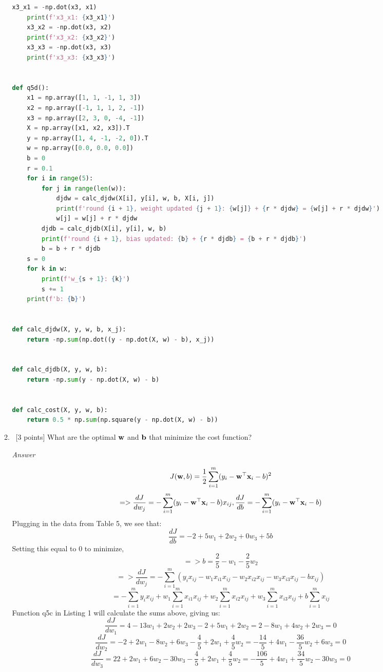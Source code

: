 \documentclass[12pt, fullpage,letterpaper]{article}
\begin{document}
\begin{enumerate}
\begin{enumerate}
\begin{lstlisting}[language=Python, caption=QuestionAnswers.part1]
    x3_x1 = -np.dot(x3, x1)
    print(f'x3_x1: {x3_x1}')
    x3_x2 = -np.dot(x3, x2)
    print(f'x3_x2: {x3_x2}')
    x3_x3 = -np.dot(x3, x3)
    print(f'x3_x3: {x3_x3}')


def q5d():
    x1 = np.array([1, 1, -1, 1, 3])
    x2 = np.array([-1, 1, 1, 2, -1])
    x3 = np.array([2, 3, 0, -4, -1])
    X = np.array([x1, x2, x3]).T
    y = np.array([1, 4, -1, -2, 0]).T
    w = np.array([0.0, 0.0, 0.0])
    b = 0
    r = 0.1
    for i in range(5):
        for j in range(len(w)):
            djdw = calc_djdw(X[i], y[i], w, b, X[i, j])
            print(f'round {i + 1}, weight updated {j + 1}: {w[j]} + {r * djdw} = {w[j] + r * djdw}')
            w[j] = w[j] + r * djdw
        djdb = calc_djdb(X[i], y[i], w, b)
        print(f'round {i + 1}, bias updated: {b} + {r * djdb} = {b + r * djdb}')
        b = b + r * djdb
    s = 0
    for k in w:
        print(f'w_{s + 1}: {k}')
        s += 1
    print(f'b: {b}')


def calc_djdw(X, y, w, b, x_j):
    return -np.sum(np.dot((y - np.dot(X, w) - b), x_j))


def calc_djdb(X, y, w, b):
    return -np.sum(y - np.dot(X, w) - b)


def calc_cost(X, y, w, b):
    return 0.5 * np.sum(np.square(y - np.dot(X, w) - b))


	\end{lstlisting}
	
	\item~[3 points] What are the optimal ${\bf w}$ and ${\bf b}$ that minimize the cost function? 
	
	\emph{Answer}
	
	\[
	    J({\bf w}, b) = \frac{1}{2} \sum_{i=1}^m (y_i - {\bf w}^\top {\bf x}_i - b)^2
	\]
	\[
        => \frac{dJ}{dw_j} = -\sum_{i=1}^m (y_i - {\bf w}^\top {\bf x}_i - b)x_{ij},  \frac{dJ}{db} = -\sum_{i=1}^m (y_i - {\bf w}^\top {\bf x}_i - b)
    \]
    Plugging in the data from Table 5, we see that:
    \[
       \frac{dJ}{db} = -2 + 5w_1 +2 w_2 + 0w_3 + 5b
    \]
    Setting this equal to 0 to minimize,
    \[
        => b = \frac{2}{5} - w_1 - \frac{2}{5}w_2
    \]
    \[
        => \frac{dJ}{dw_j} = -\sum_{i=1}^m (y_i x_{ij} - w_1 x_{i1} x_{ij} - w_2 x_{i2} x_{ij} - w_3 x_{i3} x_{ij} - b x_{ij})
    \]
    \[
        = -\sum_{i=1}^m y_i x_{ij} + w_1\sum_{i=1}^m x_{i1} x_{ij} + w_2\sum_{i=1}^m x_{i2} x_{ij} + w_3\sum_{i=1}^m x_{i3} x_{ij} + b\sum_{i=1}^m x_{ij}
    \]
    Function q5c in Listing 1 will calculate the sums above, giving us:
    \[
        \frac{dJ}{dw_1} = 4 - 13w_1 + 2w_2 + 2w_3 - 2 + 5w_1 + 2w_2 = 2 - 8w_1 + 4w_2 + 2w_3 = 0
    \]
    \[
        \frac{dJ}{dw_2} = -2 + 2w_1 - 8w_2 + 6w_3 - \frac{4}{5} + 2w_1 + \frac{4}{5}w_2 = -\frac{14}{5} + 4w_1 - \frac{36}{5}w_2 + 6w_3 = 0
    \]
    \[
        \frac{dJ}{dw_3} = 22 + 2w_1 + 6w_2 - 30w_3 - \frac{4}{5} + 2w_1 + \frac{4}{5}w_2 = -\frac{106}{5} + 4w_1 + \frac{34}{5}w_2 - 30w_3 = 0
    \]
    

\end{enumerate}
\end{enumerate}
\end{document}
